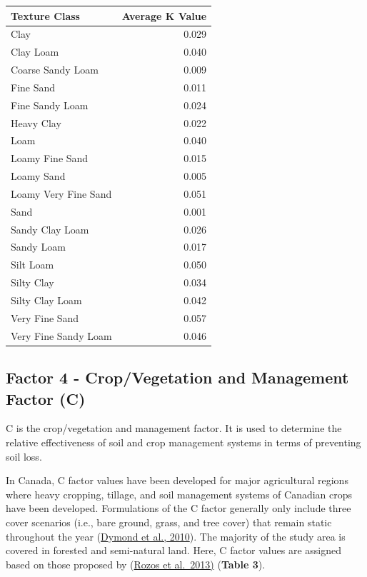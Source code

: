\documentclass[
]{article}
\begin{document}
\begin{table}
\centering
\begin{tabular}[t]{l|r}
\hline
Texture Class & Average K Value\\
\hline
Clay & 0.029\\
\hline
Clay Loam & 0.040\\
\hline
Coarse Sandy Loam & 0.009\\
\hline
Fine Sand & 0.011\\
\hline
Fine Sandy Loam & 0.024\\
\hline
Heavy Clay & 0.022\\
\hline
Loam & 0.040\\
\hline
Loamy Fine Sand & 0.015\\
\hline
Loamy Sand & 0.005\\
\hline
Loamy Very Fine Sand & 0.051\\
\hline
Sand & 0.001\\
\hline
Sandy Clay Loam & 0.026\\
\hline
Sandy Loam & 0.017\\
\hline
Silt Loam & 0.050\\
\hline
Silty Clay & 0.034\\
\hline
Silty Clay Loam & 0.042\\
\hline
Very Fine Sand & 0.057\\
\hline
Very Fine Sandy Loam & 0.046\\
\hline
\end{tabular}
\end{table}

\hypertarget{sec-factor-4}{%
\subsection*{Factor 4 - Crop/Vegetation and Management Factor (C)}\label{sec-factor-4}}

C is the crop/vegetation and management factor. It is used to determine the relative effectiveness of soil and crop management systems in terms of preventing soil loss.

In Canada, C factor values have been developed for major agricultural regions where heavy cropping, tillage, and soil management systems of Canadian crops have been developed. Formulations of the C factor generally only include three cover scenarios (i.e., bare ground, grass, and tree cover) that remain static throughout the year (\href{https://www.ncbi.nlm.nih.gov/pmc/articles/PMC2867509/}{Dymond et al., 2010}). The majority of the study area is covered in forested and semi-natural land. Here, C factor values are assigned based on those proposed by (\href{https://www.researchgate.net/publication/235988636_Application_of_the_revised_universal_soil_loss_equation_model_on_landslide_prevention_An_example_from_N_Euboea_Evia_Island_Greece}{Rozos et al.~2013)} (\textbf{Table 3}).
\end{document}
